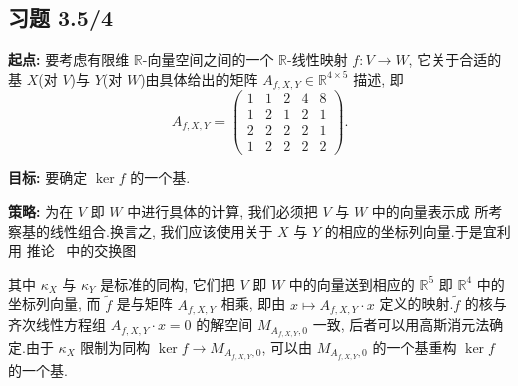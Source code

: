 \subsection*{习题 3.5/4}

\noindent\textbf{起点:} 要考虑有限维 $\mathbb{R}$-向量空间之间的一个 $\mathbb{R}$-线性映射
$f \colon V \longrightarrow W$, 它关于合适的基 $X$(对 $V$)与 $Y$(对 $W$)由具体给出的矩阵
$A_{f, X, Y} \in \mathbb{R}^{4 \times 5}$ 描述, 即
\[
A_{f, X, Y} = \begin{pmatrix} 1 & 1 & 2 & 4 & 8 \\ 1 & 2 & 1 & 2 & 1 \\ 2 & 2 & 2 & 2 & 1 \\ 1 & 2 & 2 & 2 & 2 \end{pmatrix}\text{.}
\]

\noindent\textbf{目标:} 要确定 $\ker f$ 的一个基.

\noindent\textbf{策略:} 为在 $V$ 即 $W$ 中进行具体的计算, 我们必须把 $V$ 与 $W$ 中的向量表示成
所考察基的线性组合.换言之, 我们应该使用关于 $X$ 与 $Y$ 的相应的坐标列向量.于是宜利用
推论~ 中的交换图
\begin{center}
\end{center}
其中 $\kappa_X$ 与 $\kappa_Y$ 是标准的同构, 它们把 $V$ 即 $W$ 中的向量送到相应的 $\mathbb{R}^5$
即 $\mathbb{R}^4$ 中的坐标列向量, 而 $\tilde{f}$ 是与矩阵 $A_{f, X, Y}$ 相乘, 即由
$x \longmapsto A_{f, X, Y} \cdot x$ 定义的映射.$\tilde{f}$ 的核与齐次线性方程组
$A_{f, X, Y} \cdot x = 0$ 的解空间 $M_{A_{f, X, Y}, 0}$ 一致, 后者可以用高斯消元法确定.由于
$\kappa_X$ 限制为同构 $\ker f \longrightarrow M_{A_{f, X, Y}, 0}$, 可以由 $M_{A_{f, X, Y}, 0}$
的一个基重构 $\ker f$ 的一个基.

